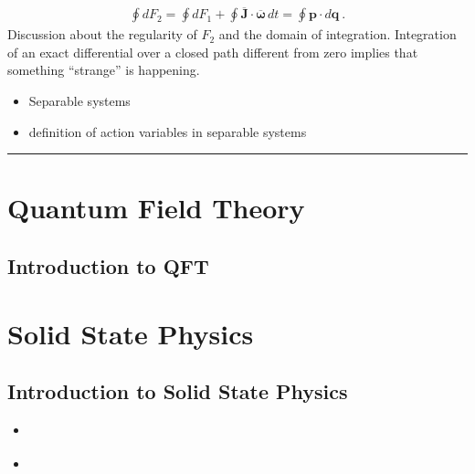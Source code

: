 \documentclass[letterpaper,10pt,english]{jupyterBook}
\begin{document}
\begin{equation*}
\begin{split}\oint d F_2 = \oint d F_1 + \oint \overline{\mathbf{J}} \cdot \overline{\boldsymbol\omega} \, dt = \oint \mathbf{p} \cdot d \mathbf{q} \ . \end{split}
\end{equation*}
\sphinxAtStartPar
{} Discussion about the regularity of \(F_2\) and the domain of integration. Integration of an exact differential over a closed path different from zero implies that something “strange” is happening.

\sphinxAtStartPar
{}
\begin{itemize}
\item {} 
\sphinxAtStartPar
Separable systems

\item {} 
\sphinxAtStartPar
definition of action variables in separable systems

\end{itemize}


\bigskip\hrule\bigskip


\sphinxstepscope


\part{Quantum Field Theory}

\sphinxstepscope


\chapter{Introduction to QFT}
\label{\detokenize{ch/qft/intro:introduction-to-qft}}\label{\detokenize{ch/qft/intro:qft-intro}}\label{\detokenize{ch/qft/intro::doc}}
\sphinxstepscope


\part{Solid State Physics}

\sphinxstepscope


\chapter{Introduction to Solid State Physics}
\label{\detokenize{ch/solid-state/intro:introduction-to-solid-state-physics}}\label{\detokenize{ch/solid-state/intro:solid-state-intro}}\label{\detokenize{ch/solid-state/intro::doc}}
\sphinxAtStartPar
{}
\begin{itemize}
\item {} 
\sphinxAtStartPar
{\hyperref[\detokenize{ch/solid-state/notes-solid-state:solid-state-notes}]{}}

\item {} 
\sphinxAtStartPar
{\hyperref[\detokenize{ch/solid-state/semiconductors-intro::doc}]{}}

\end{itemize}
\end{document}
